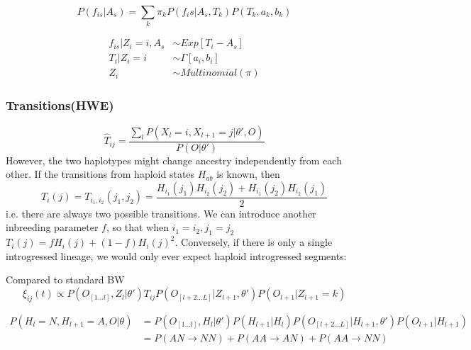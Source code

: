 \documentclass[10pt,a4paper]{article}
\begin{document}
$$P(f_{is}|A_s) = \sum_k \pi_{k} P(f_is | A_s, T_k) P(T_k, a_k, b_k)$$



\begin{align}
f_{is} | Z_i=i, A_s &\sim Exp[T_i - A_s]\\
T_i | Z_i= i &\sim \Gamma[a_i, b_i]\\
Z_i  &\sim Multinomial(\pi)
\end{align}




\subsubsection{Transitions(HWE)}
$$\hat{T}_{ij} = \frac{\sum_l P(X_l=i, X_{l+1}=j| \theta', O)}{ P(O | \theta')}$$
However, the two haplotypes might change ancestry independently from each other. If the transitions from haploid states $H_{ab}$ is known, then 
$$T_i(j) = T_{i_1, i_2}(j_1, j_2) = \frac{H_{i_1}(j_1)H_{i_2}(j_2) + H_{i_1}(j_2)H_{i_2}(j_1)}{2}$$
i.e. there are always two possible transitions. We can introduce another inbreeding parameter $f$, so that when $i_1=i_2, j_1=j_2$ 
$T_i(j) = f H_i(j) + (1-f) H_i(j)^2$. Conversely, if there is only a single introgressed lineage, we would only ever expect haploid introgressed segments:



Compared to standard BW
$$\xi_{ij}(t) \propto P(O_{[1\dots l]}, Z_l | \theta') T_{ij}  P(O_{[l+2\dots L]}|Z_{l+1}, \theta') P(O_{l+1}|Z_{l+1}=k)$$

\begin{align}
P(H_l = N, H_{l+1} = A, O |\theta) &=  P(O_{[1\dots l]}, H_l | \theta') P(H_{l+1} | H_l) P(O_{[l+2\dots L]}|H_{l+1}, \theta') P(O_{l+1}|H_{l+1})\\
&=P(AN \to NN) + P(AA \to AN) + P(AA \to NN)
\end{align}
\end{document}
